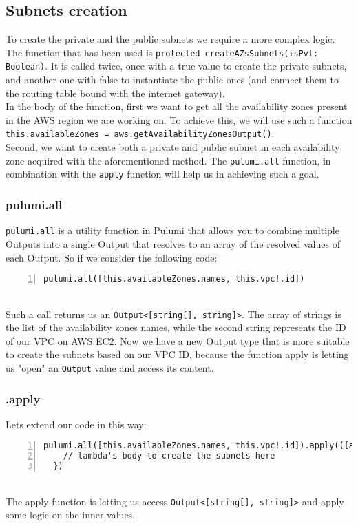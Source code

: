 \subsection{Subnets creation}
To create the private and the public subnets we require a more complex logic.
The function that has been used is \texttt{protected createAZsSubnets(isPvt: Boolean)}.
It is called twice, once with a true value to create the private subnets, and another one with false to instantiate the public ones (and connect them to the routing table bound with the internet gateway).\\
In the body of the function, first we want to get all the availability zones present in the AWS region we are working on.
To achieve this, we will use such a function \texttt{this.availableZones = aws.getAvailabilityZonesOutput()}.\\
Second, we want to create both a private and public subnet in each availability zone acquired with the aforementioned method.
The \texttt{pulumi.all} function, in combination with the \texttt{apply} function will help us in achieving such a goal.\\

\subsubsection{pulumi.all}
\texttt{pulumi.all} is a utility function in Pulumi that allows you to combine multiple Outputs into a single Output that resolves to an array of the resolved values of each Output.
So if we consider the following code:
\begin{lstlisting}[numbers=left, numberstyle=\tiny, numbersep=-5pt, stepnumber=1]
  pulumi.all([this.availableZones.names, this.vpc!.id])
\end{lstlisting}\mbox{}\\
Such a call returns us an \texttt{Output<[string[], string]>}.
The array of strings is the list of the availability zones names, while the second string represents the ID of our VPC on AWS EC2.
Now we have a new Output type that is more suitable to create the subnets based on our VPC ID, because the function apply is letting us "open" an \texttt{Output} value and access its content.

\subsubsection{.apply}
Lets extend our code in this way:
\begin{lstlisting}[numbers=left, numberstyle=\tiny, numbersep=-5pt, stepnumber=1]
  pulumi.all([this.availableZones.names, this.vpc!.id]).apply(([azNames, vpcId]) => {
    // lambda's body to create the subnets here
  })
\end{lstlisting}\mbox{}\\
The apply function is letting us access \texttt{Output<[string[], string]>} and apply some logic on the inner values.\\

